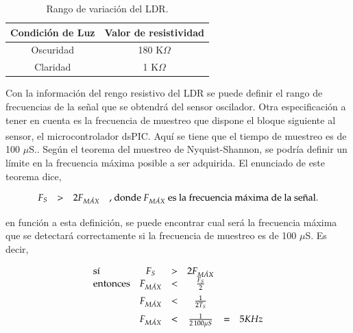 \documentclass[11pt,a4paper,oneside]{article}
\begin{document}
\begin{table}[h]
  \centering
  \begin{tabular}[h]{|c|c|}
    \hline
    \textbf{Condición de Luz} & \textbf{Valor de resistividad} \\
    \hline
    Oscuridad & 180 K$\Omega$ \\
    \hline
    Claridad & 1 K$\Omega$ \\
    \hline
  \end{tabular}
  \caption{Rango de variación del LDR.}
  \label{tab:rango-ldr}
\end{table}

Con la información del rengo resistivo del LDR se puede definir el rango de frecuencias de la señal que se obtendrá del sensor oscilador. Otra especificación a tener en cuenta es la frecuencia de muestreo que dispone el bloque siguiente al sensor, el microcontrolador dsPIC\textsuperscript{\textregistered}. Aquí se tiene que el tiempo de muestreo es de 100 $\mu$S.. Según el teorema del muestreo de Nyquist-Shannon, se podría definir un límite en la frecuencia máxima posible a ser adquirida. El enunciado de este teorema dice,

\begin{equation}
  \label{eq:nyquist}
  \begin{array}[h]{c c c c}
      F_{S} & > & 2F_{M\acute{A}X} & \text{, donde } F_{M\acute{A}X} \text{ es la frecuencia máxima de la señal.} \\
  \end{array}
\end{equation}

en función a esta definición, se puede encontrar cual será la frecuencia máxima que se detectará correctamente si la frecuencia de muestreo es de 100 $\mu$S. Es decir,

\begin{equation}
  \label{eq:freq-max}
  \begin{array}[h]{l c c c c l}
    \text{sí}       &    F_{S}        & > &    2F_{M\acute{A}X}         &     &         \\\vspace{0.2cm}
    \text{entonces} &    F_{M\acute{A}X} & < &    {F_{S}} \over 2       &     &         \\\vspace{0.2cm}
                    &    F_{M\acute{A}X} & < &    1 \over {2T_{S}}      &     &         \\\vspace{0.2cm}
                    &    F_{M\acute{A}X} & < &    1 \over {2\,100\mu S}&  =  &  5 KHz  \\
  \end{array}
\end{equation}
\end{document}

